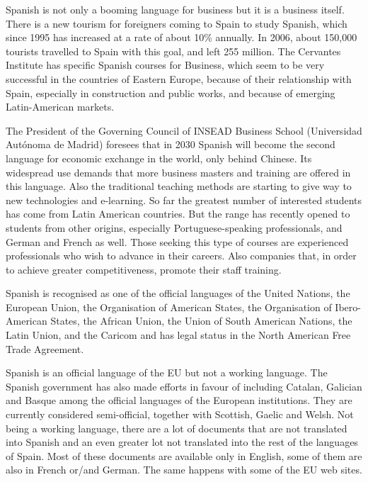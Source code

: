 \begin{multicols}{2}
Spanish is not only a booming language for business but it is a business itself. There is a new tourism for foreigners coming to Spain to study Spanish, which since 1995 has increased at a rate of about 10\% annually.  In 2006, about 150,000 tourists travelled to Spain with this goal, and left 255 million. The Cervantes Institute has specific Spanish courses for Business, which seem to be very successful in the countries of Eastern Europe, because of their relationship with Spain, especially in construction and public works, and because of emerging Latin-American markets.

The President of the Governing Council of INSEAD Business School (Universidad Autónoma de Madrid) foresees that in 2030 Spanish will become the second language for economic exchange in the world, only behind Chinese. Its widespread use demands that more business masters and training are offered in this language. Also the traditional teaching methods are starting to give way to new technologies and e-learning. So far the greatest number of interested students has come from Latin American countries. But the range has recently opened to students from other origins, especially Portuguese-speaking professionals, and German and French as well. Those seeking this type of courses are experienced professionals who wish to advance in their careers. Also companies that, in order to achieve greater competitiveness, promote their staff training.

Spanish is recognised as one of the official languages of the United Nations, the European Union, the Organisation of American States, the Organisation of Ibero-American States, the African Union, the Union of South American Nations, the Latin Union, and the Caricom and has legal status in the North American Free Trade Agreement.


Spanish is an official language of the EU but not a working language. The Spanish government has also made efforts in favour of including Catalan, Galician and Basque among the official languages of the European institutions. They are currently considered semi-official, together with Scottish, Gaelic and Welsh. Not being a working language, there are a lot of documents that are not translated into Spanish and an even greater lot not translated into the rest of the languages of Spain. Most of these documents are available only in English, some of them are also in French or/and German. The same happens with some of the EU web sites.


\end{multicols}
